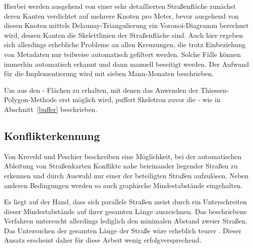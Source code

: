 \documentclass[../main/thesis.tex]{subfiles}
\begin{document}
Hierbei werden ausgehend von einer sehr detaillierten Straßenfläche zunächst deren Kanten verdichtet auf mehrere Knoten pro Meter, bevor ausgehend von diesen Knoten mittels Delaunay-Triangulierung ein Voronoi-Diagramm berechnet wird, dessen Kanten die Skelettlinien der Straßenfläche sind. Auch hier ergeben sich allerdings erhebliche Probleme an allen Kreuzungen, die trotz Einbeziehung von Metadaten nur teilweise automatisch gefiltert werden. Solche Fälle können immerhin automatisch erkannt und dann manuell beseitigt werden. Der Aufwand für die Implementierung wird mit sieben Mann-Monaten beschrieben. 

Um aus den \osm- Flächen zu erhalten, mit denen das Anwenden der Thiessen-Polygon-Methode erst möglich wird, puffert Skeletron zuvor die \osm- wie in Abschnitt~\ref{buffer} beschrieben. 



\subsection{Konflikterkennung}


Von Kreveld und Peschier beschreiben eine Möglichkeit, bei der automatischen Ableitung von Straßenkarten Konflikte nahe beieinander liegender Straßen zu erkennen und durch Auswahl nur einer der beteiligten Straßen aufzulösen. Neben anderen Bedingungen werden so auch graphische Mindestabstände eingehalten. 

Es liegt auf der Hand, dass sich parallele Straßen meist durch ein Unterschreiten dieser Mindestabstände auf ihrer gesamten Länge auszeichnen. Das beschriebene Verfahren untersucht allerdings lediglich den minimalen Abstand zweier Straßen. Das Untersuchen der gesamten Länge der Straße wäre erheblich teurer . Dieser Ansatz erscheint daher für diese Arbeit wenig erfolgversprechend.
\end{document}
